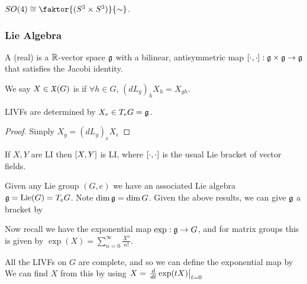 \documentclass{article}
\begin{document}
\begin{lemma}
	$SO(4) \cong \faktor{(S^3 \times S^3)}{\sim}$.
\end{lemma}


\subsubsection{Lie Algebra}

\begin{definition}
A (real)  is a $\mbb{R}$-vector space $\mf{g}$ with a bilinear, antisymmetric map $\comm[\cdot]{\cdot} : \mf{g} \times \mf{g} \to \mf{g}$ that satisfies the Jacobi identity. 
\end{definition}

\begin{definition}
	We say $X \in \mf{X}(G)$ is  if $\forall h \in G,\, (dL_g)_h X_h = X_{gh}$.
\end{definition}
 
\begin{lemma}
	LIVFs are determined by $X_e\in T_e G = \mf{g}$.
\end{lemma}
\begin{proof}
	Simply $X_g = (dL_g)_e X_e$ 
\end{proof}
 
\begin{lemma}
If $X,Y$ are LI then $\comm[X]{Y}$ is LI, where $\comm[\cdot]{\cdot}$ is the usual Lie bracket of vector fields. 
\end{lemma}

\begin{remark}
	Given any Lie group $(G,e)$ we have an associated Lie algebra $\mf{g} = \Lie(G) = T_eG$. Note $\dim\mf{g} = \dim G$. Given the above results, we can give $\mf{g}$ a bracket by 
\end{remark}


Now recall we have the exponential map $\exp : \mf{g} \to G$, and for matrix groups this is given by $\exp(X) = \sum_{n=0}^\infty \frac{X^n}{n!}$. 

\begin{remark}
All the LIVFs on $G$ are complete, and so we can define the exponential map by 
We can find $X$ from this by using $X = \ev{\frac{d}{dt} \exp(tX)}{t=0}$
\end{remark}
\end{document}
